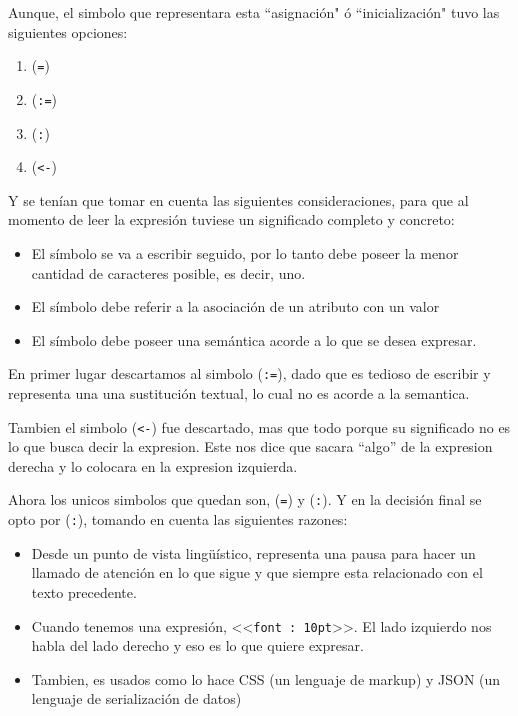 \documentclass[12pt,letterpaper,titlepage,oneside,openright]{book}
\begin{document}
Aunque, el simbolo que representara esta ``asignación" ó ``inicialización" tuvo las siguientes opciones:

\begin{center}
\begin{enumerate}[label=Opción \alph*:, leftmargin=7em]
    \item (\texttt{=})
    \item (\texttt{:=})
    \item (\texttt{:})
    \item (\texttt{<-})
\end{enumerate}
\end{center}

Y se tenían que tomar en cuenta las siguientes consideraciones, para que al momento de leer la expresión tuviese un significado completo y concreto:

\begin{itemize}
\item El símbolo se va a escribir seguido, por lo tanto debe poseer la menor
      cantidad de caracteres posible, es decir, uno.
\item El símbolo debe referir a la asociación de un atributo con un valor
\item El símbolo debe poseer una semántica acorde a lo que se desea expresar.
\end{itemize}

En primer lugar descartamos al simbolo (\texttt{:=}), dado que es tedioso de escribir y representa una una sustitución textual, lo cual no es acorde a la semantica.

Tambien el simbolo (\texttt{<-}) fue descartado, mas que todo porque su significado no es lo que busca decir la expresion. Este nos dice que sacara ``algo'' de la expresion derecha y lo colocara en la expresion izquierda.

Ahora los unicos simbolos que quedan son, (\texttt{=}) y (\texttt{:}). Y en la decisión final se opto por (\texttt{:}), tomando en cuenta las siguientes razones:

\begin{itemize}
\item Desde un punto de vista lingüístico, representa una pausa para hacer un llamado de atención en lo que sigue y que siempre esta relacionado con el texto precedente.
\item Cuando tenemos una expresión, <<\texttt{font : 10pt}>>. El lado izquierdo nos habla del lado derecho y eso es lo que quiere expresar.
\item Tambien, es usados como lo hace CSS (un lenguaje de markup) y JSON (un lenguaje de serialización de datos)
\end{itemize}
\end{document}
